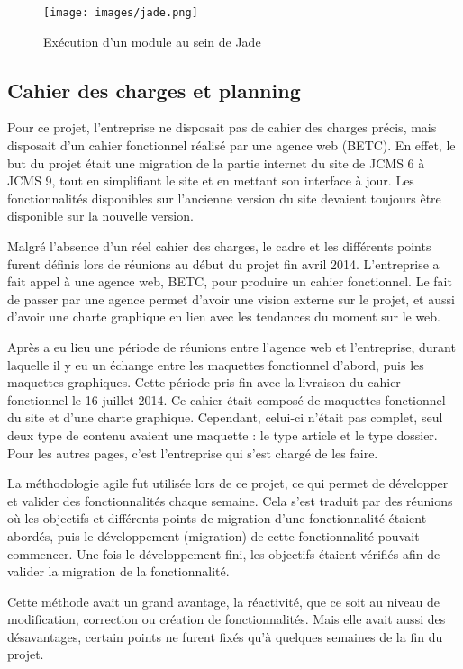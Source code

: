\documentclass[12pt,a4paper]{article}
\begin{document}
\begin{figure}[h!]
\centering
\texttt{[image: images/jade.png]} 
\caption{Exécution d'un module au sein de Jade}
\end{figure}

\newpage
\subsection{Cahier des charges et planning}
Pour ce projet, l'entreprise ne disposait pas de cahier des charges précis, mais disposait d'un cahier fonctionnel réalisé par une agence web (BETC). En effet, le but du projet était une migration de la partie internet du site de \gls{JCMS} 6 à \gls{JCMS} 9, tout en simplifiant le site et en mettant son interface à jour. Les fonctionnalités disponibles sur l'ancienne version du site devaient toujours être disponible sur la nouvelle version.\par
\medskip
Malgré l’absence d’un réel cahier des charges, le cadre et les différents points furent définis lors de réunions au début du projet fin avril 2014. L'entreprise a fait appel à une agence web, BETC, pour produire un cahier fonctionnel. Le fait de passer par une agence permet d'avoir une vision externe sur le projet, et aussi d'avoir une charte graphique en lien avec les tendances du moment sur le web.\par 
Après a eu lieu une période de réunions entre l'agence web et l'entreprise, durant laquelle il y eu un échange entre les maquettes fonctionnel d'abord, puis les maquettes graphiques. Cette période pris fin avec la livraison du cahier fonctionnel le 16 juillet 2014. Ce cahier était composé de maquettes fonctionnel du site et d'une charte graphique. Cependant, celui-ci n'était pas complet, seul deux type de contenu avaient une maquette : le type article et le type dossier. Pour les autres pages, c'est l'entreprise qui s'est chargé de les faire.\par
\medskip
La méthodologie agile fut utilisée lors de ce projet, ce qui permet de développer et valider des fonctionnalités chaque semaine. Cela s'est traduit par des réunions où les objectifs et différents points de migration d'une fonctionnalité étaient abordés, puis le développement (migration) de cette fonctionnalité pouvait commencer. Une fois le développement fini, les objectifs étaient vérifiés afin de valider la migration de la fonctionnalité.\par 
Cette méthode avait un grand avantage, la réactivité, que ce soit au niveau de modification, correction ou création de fonctionnalités. Mais elle avait aussi des désavantages, certain points ne furent fixés qu'à quelques semaines de la fin du projet.\par 
\end{document}
